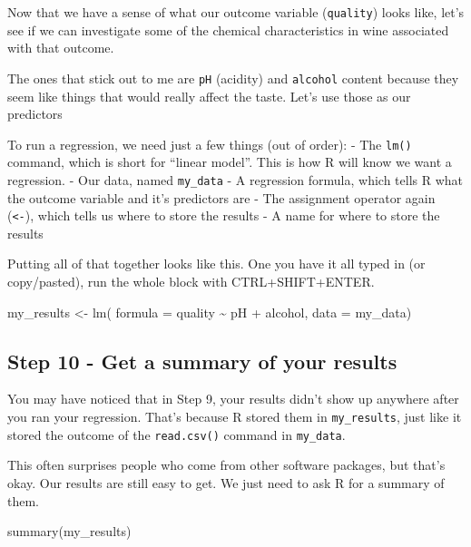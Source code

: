 \documentclass[
]{book}
\newenvironment{Shaded}{\begin{snugshade}}{\end{snugshade}}
\newcommand{\AttributeTok}[1]{\textcolor[rgb]{0.77,0.63,0.00}{#1}}
\newcommand{\FunctionTok}[1]{\textcolor[rgb]{0.00,0.00,0.00}{#1}}
\newcommand{\NormalTok}[1]{#1}
\newcommand{\OtherTok}[1]{\textcolor[rgb]{0.56,0.35,0.01}{#1}}
\newcommand{\SpecialCharTok}[1]{\textcolor[rgb]{0.00,0.00,0.00}{#1}}
\begin{document}
Now that we have a sense of what our outcome variable (\texttt{quality}) looks like, let's see if we can investigate some of the chemical characteristics in wine associated with that outcome.

The ones that stick out to me are \texttt{pH} (acidity) and \texttt{alcohol} content because they seem like things that would really affect the taste. Let's use those as our predictors

To run a regression, we need just a few things (out of order):
- The \texttt{lm()} command, which is short for ``linear model''. This is how R will know we want a regression.
- Our data, named \texttt{my\_data}
- A regression formula, which tells R what the outcome variable and it's predictors are
- The assignment operator again (\texttt{\textless{}-}), which tells us where to store the results
- A name for where to store the results

Putting all of that together looks like this. One you have it all typed in (or copy/pasted), run the whole block with CTRL+SHIFT+ENTER.

\begin{Shaded}
\begin{Highlighting}[]
\NormalTok{my\_results }\OtherTok{\textless{}{-}} \FunctionTok{lm}\NormalTok{(}
  \AttributeTok{formula =}\NormalTok{ quality }\SpecialCharTok{\textasciitilde{}}\NormalTok{ pH }\SpecialCharTok{+}\NormalTok{ alcohol,}
  \AttributeTok{data =}\NormalTok{ my\_data)}
\end{Highlighting}
\end{Shaded}

\hypertarget{step-10---get-a-summary-of-your-results}{%
\subsection{Step 10 - Get a summary of your results}\label{step-10---get-a-summary-of-your-results}}

You may have noticed that in Step 9, your results didn't show up anywhere after you ran your regression. That's because R stored them in \texttt{my\_results}, just like it stored the outcome of the \texttt{read.csv()} command in \texttt{my\_data}.

This often surprises people who come from other software packages, but that's okay. Our results are still easy to get. We just need to ask R for a summary of them.

\begin{Shaded}
\begin{Highlighting}[]
\FunctionTok{summary}\NormalTok{(my\_results)}
\end{Highlighting}
\end{Shaded}
\end{document}

